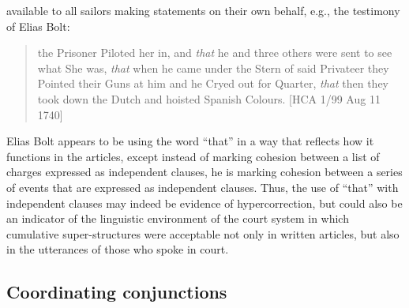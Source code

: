 available to all sailors making statements on their own behalf, e.g., the testimony of Elias Bolt:

\begin{quotation}
the Prisoner Piloted her in, and \textit{that} he and three others were sent to see what She was, \textit{that} when he came under the Stern of said Privateer they Pointed their Guns at him and he Cryed out for Quarter, \textit{that} then they took down the Dutch and hoisted Spanish Colours. [HCA 1/99  Aug 11 1740]
\end{quotation}

Elias Bolt appears to be using the word “that” in a way that reflects how it functions in the articles, except instead of marking cohesion between a list of charges expressed as independent clauses, he is marking cohesion between a series of events that are expressed as independent clauses. Thus, the use of “that” with independent clauses may indeed be evidence of hypercorrection, but could also be an indicator of the linguistic environment of the court system in which cumulative super-structures were acceptable not only in written articles, but also in the utterances of those who spoke in court. 

\subsection{{Coordinating conjunctions} }%

